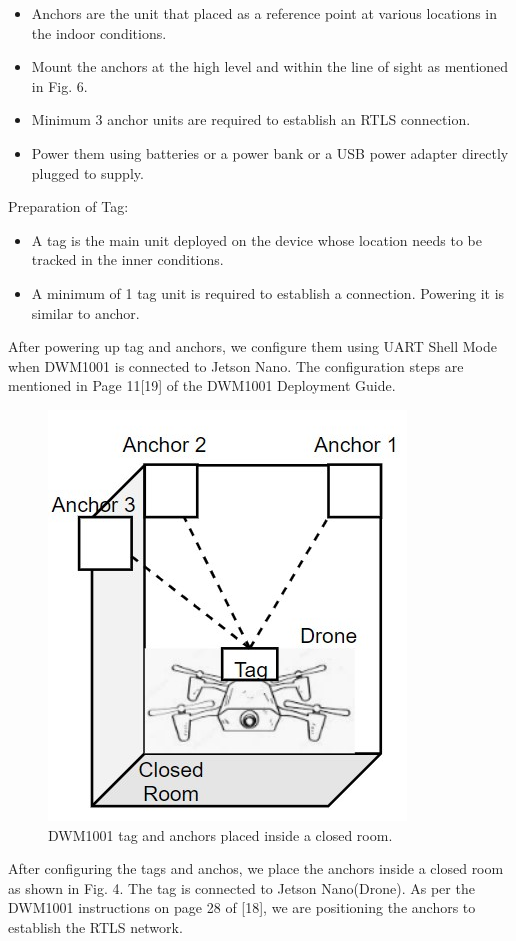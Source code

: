 \documentclass{IEEEtran}
\begin{document}
\begin{itemize}
\item Anchors are the unit that placed as a reference point at various locations in the indoor conditions.
\item Mount the anchors at the high level and within the line of sight as mentioned in Fig. 6.
\item Minimum 3  anchor units are required to establish an RTLS connection.
\item Power them using batteries or a power bank or a USB power adapter directly plugged to supply.
\end{itemize}

Preparation of Tag:

\begin{itemize}
\item A tag is the main unit deployed on the device whose location needs to be tracked in the inner conditions.
\item A minimum of 1 tag unit is required to establish a connection. Powering it is similar to anchor.
\end{itemize}

After powering up tag and anchors, we configure them using UART Shell Mode when DWM1001 is connected to Jetson Nano. The configuration steps are mentioned in Page 11[19] of the DWM1001 Deployment Guide.

\begin{figure}[htb]
\centering
\includegraphics[width=0.5\linewidth]{fig/anchor_position_uwb.jpg}
\caption{DWM1001 tag and anchors placed inside a closed room.} \label{fig.structure}
\end{figure}

After configuring the tags and anchos, we place the anchors inside a closed room as shown in Fig. 4. The tag is connected to Jetson Nano(Drone). As per the DWM1001 instructions on page 28 of [18], we are positioning the anchors to establish the RTLS network.
\end{document}
